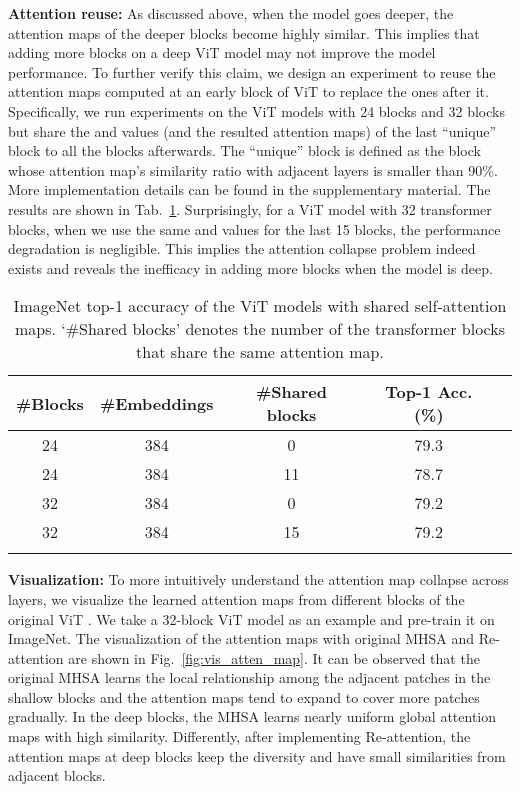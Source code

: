 \documentclass[10pt,twocolumn,letterpaper]{article}
\newcommand{\nameofatten}{Re-attention}
\newcommand{\myPara}[1]{\vspace{.05in}\noindent\textbf{#1}}
\begin{document}
\myPara{Attention reuse:}
As discussed above, when the model goes deeper, the attention maps of the deeper blocks 
become highly similar. This implies that adding more blocks on a deep ViT model may not improve  the model performance.
To further verify this claim, we design an experiment to reuse the attention maps computed 
at an early block of ViT to replace the ones after it. 
Specifically, we run experiments on the ViT models with 24 blocks and 32 blocks
but share the  and   values (and the resulted attention maps) of the  last ``unique'' block   to  all the blocks afterwards.
The ``unique'' block is defined as the block whose  attention map's similarity ratio
with adjacent layers is smaller than 90\%. More implementation details can be found in the supplementary material. 
The results are shown in Tab.~\ref{tab:ablation_sharing}. 
Surprisingly, for a ViT model with 32 transformer blocks, when we use the same   and  values for 
the last 15 blocks, the performance degradation is negligible.
This implies the attention collapse problem indeed exists
and reveals the inefficacy in adding more blocks when the model is deep.  

\begin{table}[h]
\footnotesize
\caption{ImageNet top-1 accuracy of the ViT models with shared self-attention maps. `\#Shared blocks' denotes the number of the transformer blocks that share the same attention map.  }
\label{tab:ablation_sharing}
\centering
\begin{tabular}{ccccc}
\toprule
\bf \#Blocks
&\bf \#Embeddings
&\bf \#Shared blocks
&\bf Top-1 Acc. (\%)
\\ \midrule 24 & 384 & 0 & 79.3 \\
24 &  384 & 11 & 78.7 \\ 
\midrule
32 &  384   & 0 & 79.2 \\ 
32 &  384   & 15 & 79.2 \\ 
\bottomrule
\vspace{-5mm}
\end{tabular}
\end{table}

\myPara{Visualization:} To more intuitively  understand   the attention map collapse across layers, we visualize the learned attention maps from different blocks of the original ViT \cite{dosovitskiy2020image}.
We take a 32-block ViT model as an example and pre-train it on ImageNet. The visualization of the attention maps with original MHSA and \nameofatten{}  are shown 
in Fig.~\ref{fig:vis_atten_map}. 
{It can be observed that the original MHSA learns the local relationship  among the adjacent 
  patches in  the shallow blocks and the attention maps tend to expand to cover more patches gradually. In the deep blocks, the MHSA learns   nearly uniform global attention maps with high similarity. Differently, after implementing \nameofatten{}, the attention maps at deep blocks keep the diversity and have small similarities from adjacent blocks.}
\end{document}
